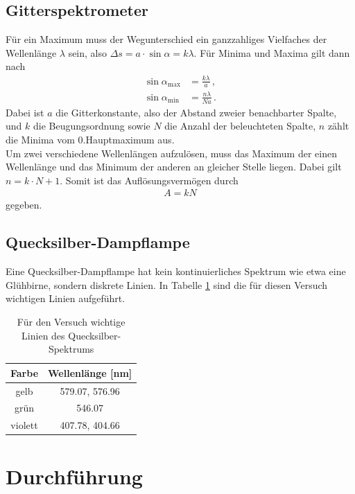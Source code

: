 \documentclass[12pt,a4paper,titlepage,headinclude,bibtotoc]{scrartcl}
\begin{document}
\subsection{Gitterspektrometer}
Für ein Maximum muss der Wegunterschied ein ganzzahliges Vielfaches der Wellenlänge $\lambda$ sein, also $\Delta s=a \cdot \sin \alpha=k \lambda$.
Für Minima und Maxima gilt dann nach \cite[S.461ff.]{hecht}
\begin{align}
	\sin\alpha_\text{max}&=\frac{k\lambda}{a}\,,
	\label{eq:gitterMax}\\
	\sin\alpha_\text{min}&=\frac{n\lambda}{Na}\,.
\end{align}
Dabei ist $a$ die Gitterkonstante, also der Abstand zweier benachbarter Spalte, und $k$ die Beugungsordnung sowie $N$ die Anzahl der beleuchteten Spalte, $n$ zählt die Minima vom 0.Hauptmaximum aus.\\

Um zwei verschiedene Wellenlängen aufzulösen, muss das Maximum der einen Wellenlänge und das Minimum der anderen an gleicher Stelle liegen.
Dabei gilt $n=k\cdot N+1$.
Somit ist das Auflösungsvermögen durch
\begin{align}
	A=kN
	\label{eq:gitterA}
\end{align}
gegeben.

\subsection{Quecksilber-Dampflampe}
Eine Quecksilber-Dampflampe hat kein kontinuierliches Spektrum wie etwa eine Glühbirne, sondern diskrete Linien.
In Tabelle \ref{tab:Hg-Linien} sind die für diesen Versuch wichtigen Linien aufgeführt.

\begin{table}[!h]
	\centering
	\begin{tabular}{|c|c|}
	    \hline		
		Farbe & Wellenlänge [nm]\\
		\hline
		\hline
		gelb & 579.07, 576.96\\
		\hline		
		grün & 546.07\\
		\hline
		violett & 407.78, 404.66\\
		\hline	
	\end{tabular}
	\caption{Für den Versuch wichtige Linien des Quecksilber-Spektrums}
	\label{tab:Hg-Linien}
\end{table}

\section{Durchführung}
\label{sec:durchfuehrung}
\end{document}
